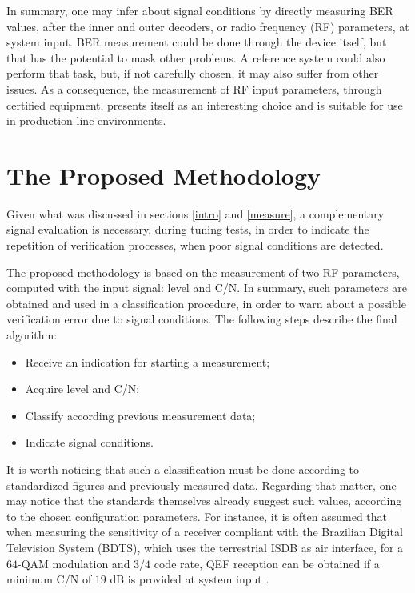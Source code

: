 \documentclass[conference]{IEEEtran}
\begin{document}
In summary, one may infer about signal conditions by directly measuring BER values, after the inner and outer decoders, or radio frequency (RF) parameters, at system input. BER measurement could be done through the device itself, but that has the potential to mask other problems. A reference system could also perform that task, but, if not carefully chosen, it may also suffer from other issues. As a consequence, the measurement of RF input parameters, through certified equipment, presents itself as an interesting choice and is suitable for use in production line environments.

\section{The Proposed Methodology}\label{metho}
Given what was discussed in sections \ref{intro} and \ref{measure}, a complementary signal evaluation is necessary, during tuning tests, in order to indicate the repetition of verification processes, when poor signal conditions are detected. 

The proposed methodology is based on the measurement of two RF parameters, computed with the input signal: level and C/N. In summary, such parameters are obtained and used in a classification procedure, in order to warn about a possible verification error due to signal conditions. The following steps describe the final algorithm:

\begin{itemize}
	\item Receive an indication for starting a measurement;
	\item Acquire level and C/N;
	\item Classify according previous measurement data;
	\item Indicate signal conditions.
\end{itemize}

It is worth noticing that such a classification must be done according to standardized figures and previously measured data. Regarding that matter, one may notice that the standards themselves already suggest such values, according to the chosen configuration parameters. For instance, it is often assumed that when measuring the sensitivity of a receiver compliant with the Brazilian Digital Television System (BDTS), which uses the terrestrial ISDB as air interface, for a $64$-QAM modulation and $3/4$ code rate, QEF reception can be obtained if a minimum C/N of $19$ dB is provided at system input \cite{sbtvd}. 
\end{document}
